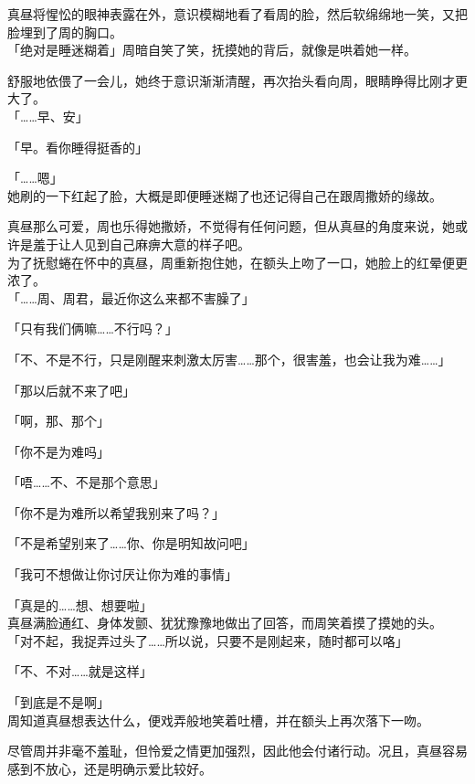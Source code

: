 真昼将惺忪的眼神表露在外，意识模糊地看了看周的脸，然后软绵绵地一笑，又把脸埋到了周的胸口。\\

「绝对是睡迷糊着」周暗自笑了笑，抚摸她的背后，就像是哄着她一样。

舒服地依偎了一会儿，她终于意识渐渐清醒，再次抬头看向周，眼睛睁得比刚才更大了。\\

「……早、安」

「早。看你睡得挺香的」

「……嗯」\\

她刷的一下红起了脸，大概是即便睡迷糊了也还记得自己在跟周撒娇的缘故。

真昼那么可爱，周也乐得她撒娇，不觉得有任何问题，但从真昼的角度来说，她或许是羞于让人见到自己麻痹大意的样子吧。\\

为了抚慰蜷在怀中的真昼，周重新抱住她，在额头上吻了一口，她脸上的红晕便更浓了。\\

「……周、周君，最近你这么来都不害臊了」

「只有我们俩嘛……不行吗？」

「不、不是不行，只是刚醒来刺激太厉害……那个，很害羞，也会让我为难……」

「那以后就不来了吧」

「啊，那、那个」

「你不是为难吗」

「唔……不、不是那个意思」

「你不是为难所以希望我别来了吗？」

「不是希望别来了……你、你是明知故问吧」

「我可不想做让你讨厌让你为难的事情」

「真是的……想、想要啦」\\

真昼满脸通红、身体发颤、犹犹豫豫地做出了回答，而周笑着摸了摸她的头。\\

「对不起，我捉弄过头了……所以说，只要不是刚起来，随时都可以咯」

「不、不对……就是这样」

「到底是不是啊」\\

周知道真昼想表达什么，便戏弄般地笑着吐槽，并在额头上再次落下一吻。

尽管周并非毫不羞耻，但怜爱之情更加强烈，因此他会付诸行动。况且，真昼容易感到不放心，还是明确示爱比较好。\\

